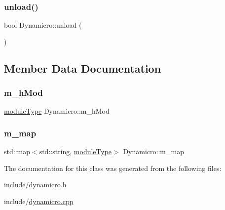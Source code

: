 \mbox{\label{class_dynamicro_a80f1cc3d7f5a22c7ef0824ac86cd36c1}} 
\subsubsection{\texorpdfstring{unload()}{unload()}}
{\footnotesize\ttfamily bool Dynamicro\+::unload (\begin{DoxyParamCaption}{ }\end{DoxyParamCaption})}



\subsection{Member Data Documentation}
\mbox{\label{class_dynamicro_aa4012590c2140283b7d74dbc47f6ba72}} 
\subsubsection{\texorpdfstring{m\_hMod}{m\_hMod}}
{\footnotesize\ttfamily \mbox{\hyperlink{class_dynamicro_a8476681e7880be183a320960f3373a47}{module\+Type}} Dynamicro\+::m\+\_\+h\+Mod\hspace{0.3cm}{\ttfamily [private]}}

\mbox{\label{class_dynamicro_ad90c1bb73dfca18828f8a874ecaab102}} 
\subsubsection{\texorpdfstring{m\_map}{m\_map}}
{\footnotesize\ttfamily std\+::map$<$std\+::string, \mbox{\hyperlink{class_dynamicro_a8476681e7880be183a320960f3373a47}{module\+Type}}$>$ Dynamicro\+::m\+\_\+map\hspace{0.3cm}{\ttfamily [private]}}



The documentation for this class was generated from the following files\+:\begin{DoxyCompactItemize}
\item 
include/\mbox{\hyperlink{dynamicro_8h}{dynamicro.\+h}}\item 
include/\mbox{\hyperlink{dynamicro_8cpp}{dynamicro.\+cpp}}\end{DoxyCompactItemize}
